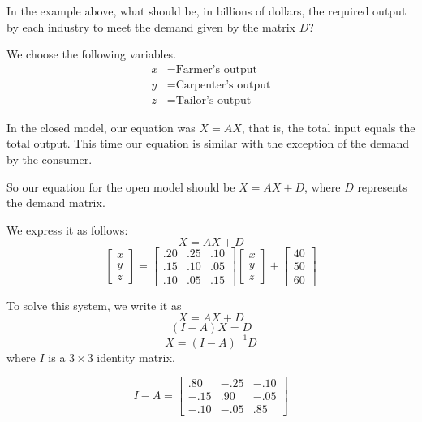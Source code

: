 \begin{example}
    In the example above, what should be, in billions of dollars, the required output by each industry to meet the demand given by the matrix \( D \)?
\end{example}

\begin{solution}
    We choose the following variables.
    \[
        \begin{aligned}
            x & = \text{Farmer's output}    \\
            y & = \text{Carpenter's output} \\
            z & = \text{Tailor's output}
        \end{aligned}
    \]

    In the closed model, our equation was \( X = AX \), that is, the total input equals the total output. This time our equation is similar with the exception of the demand by the consumer.

    So our equation for the open model should be \( X = AX + D \), where \( D \) represents the demand matrix.

    We express it as follows:
    \[ X = AX + D \]
    \[ \begin{bmatrix}
            x \\
            y \\
            z
        \end{bmatrix} = \begin{bmatrix}
            .20 & .25 & .10 \\
            .15 & .10 & .05 \\
            .10 & .05 & .15
        \end{bmatrix} \begin{bmatrix}
            x \\
            y \\
            z
        \end{bmatrix} + \begin{bmatrix}
            40 \\
            50 \\
            60
        \end{bmatrix} \]

    To solve this system, we write it as
    \[ X = AX + D \]
    \[ (I - A)X = D \]
    \[ X = (I - A)^{-1} D \]
    where \( I \) is a \( 3 \times 3 \) identity matrix.

    \[ I - A = \begin{bmatrix}
            .80  & -.25 & -.10 \\
            -.15 & .90  & -.05 \\
            -.10 & -.05 & .85
        \end{bmatrix} \]


\end{solution}
